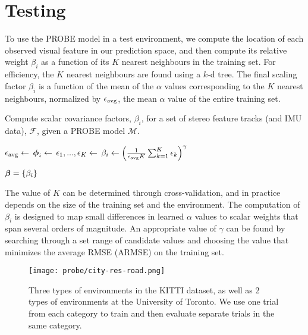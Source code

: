 \section{Testing}
To use the PROBE model in a test environment, we compute the location of each observed visual feature in our prediction space, and then compute its relative weight $\beta_i$ as a function of its $K$ nearest neighbours in the training set.
For efficiency, the $K$ nearest neighbours are found using a $k$-d tree.
The final scaling factor $\beta_i$ is a function of the mean of the $\alpha$ values corresponding to the $K$ nearest neighbours, normalized by $\epsilon_\text{avg}$, the mean $\alpha$ value of the entire training set.

\begin{algorithm}
  \caption{Compute scalar covariance factors, $\beta_i$, for a set of stereo feature tracks (and IMU data), $\mathcal{F}$, given a PROBE model $\mathcal{M}$.}
  \label{alg:probe_test}
  \begin{algorithmic}
     \State $\epsilon_\text{avg} \gets$ 
        \State $\boldsymbol{\mathbf{\phi}}_i \gets$  
        \State $\epsilon_1,...,\epsilon_K \gets$ 
		\State $\beta_i \gets \left(\frac{1}{\epsilon_\text{avg} K} \sum_{k=1}^K \epsilon_k  \right)^{\gamma}$
		
	   \EndFor
      \State\Return $\boldsymbol{\beta} = \{\beta_i\}$
    \EndFunction
  \end{algorithmic}
\end{algorithm}


The value of $K$ can be determined through cross-validation, and in practice depends on the size of the training set and the environment.
The computation of $\beta_i$ is designed to map small differences in learned $\alpha$ values to scalar weights that span several orders of magnitude.
An appropriate value of $\gamma$ can be found by searching through a set range of candidate values and choosing the value that minimizes the average RMSE (ARMSE) on the training set.

\begin{figure}
    \centering
    \texttt{[image: probe/city-res-road.png]}
    \caption{Three types of environments in the KITTI dataset, as well as 2 types of environments at the University of Toronto.  We use one trial from each category to train and then evaluate separate trials in the same category.}
    \label{fig:probe_KITTI-Types}
\end{figure}

